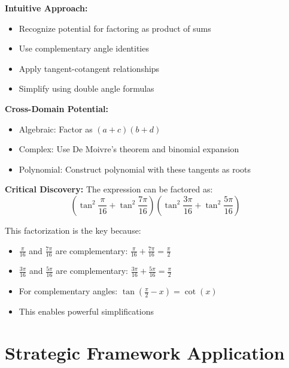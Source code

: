 \documentclass[12pt]{article}
\begin{document}
\begin{problemconfigbox}
\textbf{Intuitive Approach:} 
\begin{itemize}
    \item Recognize potential for factoring as product of sums
    \item Use complementary angle identities
    \item Apply tangent-cotangent relationships
    \item Simplify using double angle formulas
\end{itemize}

\textbf{Cross-Domain Potential:}
\begin{itemize}
    \item Algebraic: Factor as $(a+c)(b+d)$
    \item Complex: Use De Moivre's theorem and binomial expansion
    \item Polynomial: Construct polynomial with these tangents as roots
\end{itemize}

\end{problemconfigbox}

\begin{keyinsight}
\textbf{Critical Discovery:} The expression can be factored as:
\[\left(\tan^2\frac{\pi}{16}+\tan^2 \frac{7\pi}{16}\right)\left(\tan^2\frac{3\pi}{16}+\tan^2 \frac{5\pi}{16}\right)\]

This factorization is the key because:
\begin{itemize}
    \item $\frac{\pi}{16}$ and $\frac{7\pi}{16}$ are complementary: $\frac{\pi}{16} + \frac{7\pi}{16} = \frac{\pi}{2}$
    \item $\frac{3\pi}{16}$ and $\frac{5\pi}{16}$ are complementary: $\frac{3\pi}{16} + \frac{5\pi}{16} = \frac{\pi}{2}$
    \item For complementary angles: $\tan(\frac{\pi}{2} - x) = \cot(x)$
    \item This enables powerful simplifications
\end{itemize}
\end{keyinsight}

\section{Strategic Framework Application}
\end{document}

